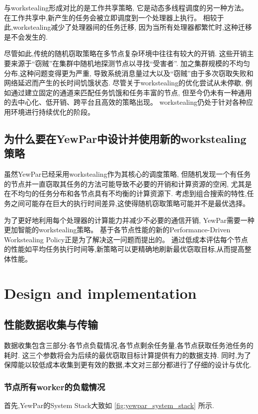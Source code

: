 \documentclass{mproj}
\begin{document}
与workstealing形成对比的是工作共享策略,
它是动态多线程调度的另一种方法。
在工作共享中,新产生的任务会被立即调度到一个处理器上执行。
相较于此,workstealing减少了处理器间的任务迁移,
因为当所有处理器都繁忙时,这种迁移是不会发生的.\cite{10.1145/324133.324234}

尽管如此,传统的随机窃取策略在多节点复杂环境中往往有较大的开销.
这些开销主要来源于“窃贼”在集群中随机地探测节点以寻找“受害者”.
加之集群规模的不均匀分布,这种问题变得更为严重,
导致系统消息量过大以及“窃贼”由于多次窃取失败和网络延迟而产生的长时间饥饿状态.
尽管关于workstealing的优化尝试从未停歇,
例如通过建立固定的通道来匹配任务饥饿和任务丰富的节点\cite{10.1145/3016078.2851175},
但至今仍未有一种通用的去中心化、低开销、跨平台且高效的策略出现。
workstealing仍处于针对各种应用环境进行持续优化的阶段。

\section{为什么要在YewPar中设计并使用新的workstealing策略}

虽然YewPar已经采用workstealing作为其核心的调度策略,
但随机发现一个有任务的节点并一直窃取其任务的方法可能导致不必要的开销和计算资源的空闲,
尤其是在不均匀的任务分布和各节点具有不均衡的计算资源下.
考虑到组合搜索的特性,任务之间可能存在巨大的执行时间差异,这使得随机窃取策略可能并不是最优选择。

为了更好地利用每个处理器的计算能力并减少不必要的通信开销,
YewPar需要一种更加智能的workstealing策略。
基于各节点性能的新的Performance-Driven Workstealing Policy正是为了解决这一问题而提出的。
通过低成本评估每个节点的性能如平均任务执行时间等,新策略可以更精确地刷新最优窃取目标,从而提高整体性能。

\chapter{Design and implementation}

\section{性能数据收集与传输}
数据收集包含三部分:各节点负载情况,各节点剩余任务量,各节点获取任务池任务的耗时.
这三个参数将会为后续的最优窃取目标计算提供有力的数据支持.
同时,为了保障能以较低成本收集到更有效的数据,本文对三部分都进行了仔细的设计与优化.

\subsection{节点所有worker的负载情况}
首先,YewPar的System Stack大致如
\cref{fig:yewpar_system_stack}
\cite{10.1007/978-3-030-29400-7_14}
所示.
\end{document}
